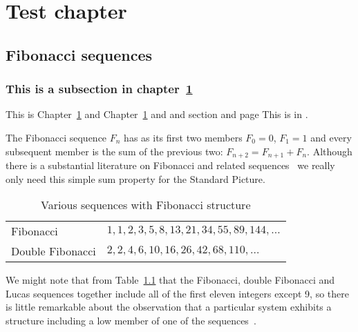 

\chapter{Test chapter}


\label{CH:0}

\section{Fibonacci sequences}
\label{sec:fib}
\subsection{This is a subsection in chapter~\ref{CH:0}}
This is Chapter~\ref{CH:0} and {\jHeadingColour Chapter~\ref{CH:0}} and  and section  and page 
This is  in .

The Fibonacci sequence $F_n$ has as its first two members  $F_0=0$, $F_1=1$ and every subsequent member is the sum of the previous two:  $F_{n+2}=F_{n+1}+F_{n}$. 
Although there is a substantial literature on Fibonacci and related sequences~\cite{vajdaFibonacciLucasNumbers2008} we really only need this simple sum property for the Standard Picture. 
%
\begin{table}[h]
	\begin{center}
		\begin{tabular}{ll}
			\hline
			Fibonacci  &  $1,1,2,3,5,8,13,21,34,55,89,144,\ldots$ \Tstrut
			\\
			Double Fibonacci & $2,2,4,6,10,16,26,42,68,110,\ldots$
			\\
			\hline
		\end{tabular}
		\caption{Various sequences with Fibonacci structure}
		\label{tab:sequences}
	\end{center}
\end{table}
%

We might note that from Table~\ref{tab:sequences} that the Fibonacci, double Fibonacci and Lucas sequences together include all  of the first eleven integers except 9, so there is little remarkable about the observation that a particular system exhibits a structure including a low member of one of the sequences~\cite{cookeFibonacciNumbersReveal2006}. 



